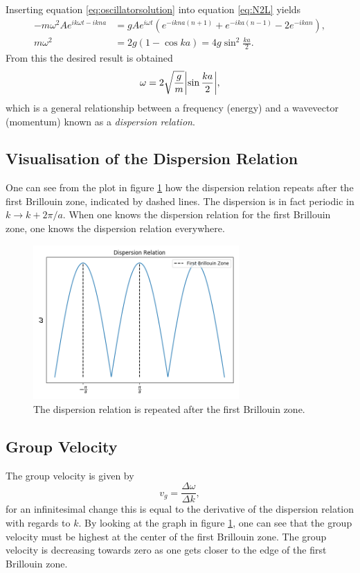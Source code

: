 \documentclass[11pt]{amsart}
\begin{document}
Inserting equation \ref{eq:oscillatorsolution} into equation \ref{eq:N2L} yields
\begin{align*}
-m\omega^2Ae^{ik\omega t - ikna} &= gAe^{i\omega t}(e^{-ikna(n+1)} + e^{-ika(n-1)} - 2e^{-ikan}), \\
m\omega^2 &= 2g(1-\cos ka) = 4g\sin^2 \frac{ka}{2}.
\end{align*}
From this the desired result is obtained
\begin{equation}
\omega = 2\sqrt{\frac{g}{m}}\abs{\sin{\frac{ka}{2}}},
\end{equation}
which is a general relationship between a frequency (energy) and a wavevector (momentum) known as a \emph{dispersion relation}.

\subsection{Visualisation of the Dispersion Relation}
One can see from the plot in figure \ref{fig:brillouin_dispersion} how the dispersion relation repeats after the first Brillouin zone, indicated by dashed lines. The dispersion is in fact periodic in $k \rightarrow k + 2\pi/a$. When one knows the dispersion relation for the first Brillouin zone, one knows the dispersion relation everywhere.

\begin{figure}
\centering
	\includegraphics[width=0.7\textwidth]{first_brillouin.png}
	\caption{The dispersion relation is repeated after the first Brillouin zone.}
	\label{fig:brillouin_dispersion}
\end{figure}

\subsection{Group Velocity}
The group velocity is given by
\begin{equation}
v_g = \frac{\Delta \omega}{\Delta k},
\end{equation}
for an infinitesimal change this is equal to the derivative of the dispersion relation with regards to $k$. By looking at the graph in figure \ref{fig:brillouin_dispersion}, one can see that the group velocity must be highest at the center of the first Brillouin zone. The group velocity is decreasing towards zero as one gets closer to the edge of the first Brillouin zone. 
\end{document}
